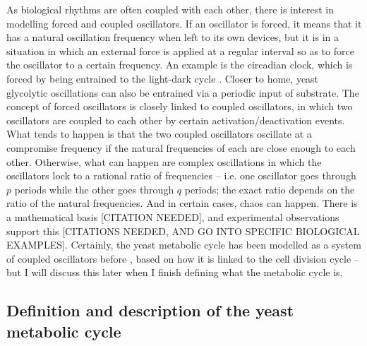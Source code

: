 As biological rhythms are often coupled with each other, there is interest in modelling forced and coupled oscillators.
If an oscillator is forced, it means that it has a natural oscillation frequency when left to its own devices, but it is in a situation in which an external force is applied at a regular interval so as to force the oscillator to a certain frequency.
An example is the circadian clock, which is forced by being entrained to the light-dark cycle \parencite{goldbeterMultisynchronizationOtherPatterns}.
Closer to home, yeast glycolytic oscillations can also be entrained via a periodic input of substrate.
The concept of forced oscillators is closely linked to coupled oscillators, in which two oscillators are coupled to each other by certain activation/deactivation events.
What tends to happen is that the two coupled oscillators oscillate at a compromise frequency if the natural frequencies of each are close enough to each other.
Otherwise, what can happen are complex oscillations in which the oscillators lock to a rational ratio of frequencies -- i.e. one oscillator goes through $p$ periods while the other goes through $q$ periods; the exact ratio depends on the ratio of the natural frequencies.
And in certain cases, chaos can happen.
There is a mathematical basis [CITATION NEEDED], and experimental observations support this [CITATIONS NEEDED, AND GO INTO SPECIFIC BIOLOGICAL EXAMPLES].
Certainly, the yeast metabolic cycle has been modelled as a system of coupled oscillators before \citep{papagiannakisAutonomousMetabolicOscillations2017,ozsezenInferenceHighLevelInteraction2019}, based on how it is linked to the cell division cycle -- but I will discuss this later when I finish defining what the metabolic cycle is.

\subsection{Definition and description of the yeast metabolic cycle}
\label{subsec:intro-ymc-definition}


